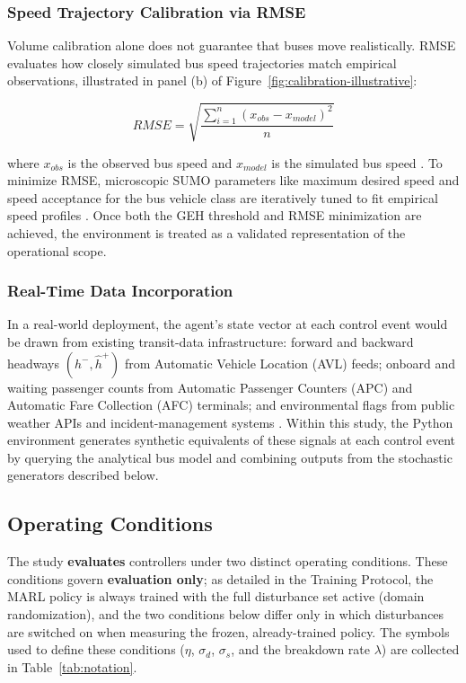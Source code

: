 \subsubsection{Speed Trajectory Calibration via RMSE}

Volume calibration alone does not guarantee that buses move realistically. RMSE evaluates how closely simulated bus speed trajectories match empirical observations, illustrated in panel (b) of Figure~\ref{fig:calibration-illustrative}:

\begin{equation} RMSE = \sqrt{\frac{\sum_{i=1}^{n}(x_{obs} - x_{model})^2}{n}} \label{eq:rmse} \end{equation}

where $x_{obs}$ is the observed bus speed and $x_{model}$ is the simulated bus speed \cite{Ollero2024EDSA}. To minimize RMSE, microscopic SUMO parameters like maximum desired speed and speed acceptance for the bus vehicle class are iteratively tuned to fit empirical speed profiles \cite{Ollero2024EDSA}. Once both the GEH threshold and RMSE minimization are achieved, the environment is treated as a validated representation of the operational scope.

\subsubsection{Real-Time Data Incorporation}

In a real-world deployment, the agent's state vector at each control event would be drawn from existing transit-data infrastructure: forward and backward headways $(h^-, \hat{h}^+)$ from Automatic Vehicle Location (AVL) feeds; onboard and waiting passenger counts from Automatic Passenger Counters (APC) and Automatic Fare Collection (AFC) terminals; and environmental flags from public weather APIs and incident-management systems \cite{Wangsun}. Within this study, the Python environment generates synthetic equivalents of these signals at each control event by querying the analytical bus model and combining outputs from the stochastic generators described below.

\subsection{Operating Conditions}

The study \textbf{evaluates} controllers under two distinct operating conditions. These conditions govern \textbf{evaluation only}; as detailed in the Training Protocol, the MARL policy is always trained with the full disturbance set active (domain randomization), and the two conditions below differ only in which disturbances are switched on when measuring the frozen, already-trained policy. The symbols used to define these conditions ($\eta$, $\sigma_d$, $\sigma_s$, and the breakdown rate $\lambda$) are collected in Table~\ref{tab:notation}.

